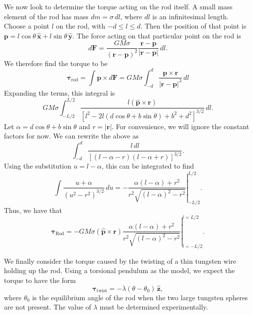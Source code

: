 \documentclass[aps, reprint,amsmath,amssymb]{revtex4-1} %
\renewcommand{\vec}[1]{\boldsymbol{#1}}
\newcommand{\uv}[1]{\vec{\hat{#1}}}
\newcommand{\x}{\vec{\hat{x}}}
\newcommand{\y}{\vec{\hat{y}}}
\newcommand{\z}{\vec{\hat{z}}}
\begin{document}
We now look to determine the torque acting on the rod itself. A small mass
element of the rod has mass $dm = \sigma\,dl$, where $dl$ is an
infinitesimal length. Choose a point $l$ on the rod, with $-d\leq l \leq
d$. Then the position of that point is $\vec{p} = l\cos\theta\,\x +
l\sin\theta\,\y$. The force acting on that particular point on the rod is
\[
    d\vec{F} = \frac{G M \sigma}{(\vec{r} - \vec{p})^2} \frac{\vec{r} -
    \vec{p}}{|\vec{r} - \vec{p}|} \, dl.
\]
We therefore find the torque to be
\begin{equation}
    \label{eq:almost_rod_torque}
    \vec{\tau}_\text{rod} = \int \vec{p} \times d\vec{F}
    = G M \sigma \int_{-d}^d \frac{\vec{p}\times\vec{r}}{|\vec{r} -
    \vec{p}|^3} \, dl
\end{equation}
Expanding the terms, this integral is
\[
    G M \sigma \int_{-L/2}^{L/2} \frac{l (\uv{p} \times \vec{r}) }
{[l^2 - 2l (d \cos \theta + b \sin \theta) + b^2 + d^2]^{3/2}}\, dl.
\]
Let $\alpha = d \cos \theta + b \sin \theta$ and $r = |\vec{r}|$.
For convenience, we will ignore the constant factors for now. 
We can rewrite the above as
\[
    \int_{-d}^{d} \frac{l\,dl}
    {[ (l - \alpha - r) (l - \alpha + r)]^{3/2}}.
\]
Using the substitution $u = l - \alpha$, this can be integrated to
find
\[
    \int \frac{u + \alpha}{(u^2 - r^2)^{3/2}}\,du
    = -\left.\frac{\alpha (l-\alpha) + r^2}
    {r^2 \sqrt{(l-\alpha)^2 - r^2}} \right|_{-L/2}^{L/2}.
\]
Thus, we have that
\begin{equation}\label{eq:rod_torque}
    \vec{\tau}_\text{Rod} = - G M \sigma (\uv{p}\times\vec{r}) 
    \left.
    \frac{\alpha (l - \alpha) + r^2}
    {r^2 \sqrt{(l-\alpha)^2 - r^2}}
    \right|_{l=-L/2}^{l = L/2}.
\end{equation}

We finally consider the torque caused by the twisting of a thin tungsten
wire holding up the rod. Using a torsional pendulum as the model, we expect
the torque to have the form
\begin{equation}
    \label{eq:torsional_pendulum}
    \vec{\tau}_\text{twist} = - \lambda (\theta - \theta_0) \,\z,
\end{equation}
where $\theta_0$ is the equilibrium angle of the rod when the two large
tungsten spheres are not present. The value of $\lambda$ must be determined
experimentally. 
\end{document}
